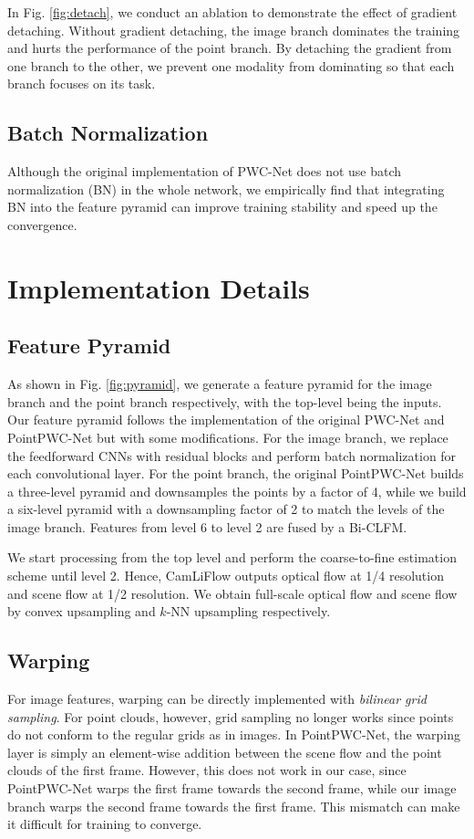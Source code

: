 \documentclass[10pt,twocolumn,letterpaper]{article}
\begin{document}
In Fig. \ref{fig:detach}, we conduct an ablation to demonstrate the effect of gradient detaching. Without gradient detaching, the image branch dominates the training and hurts the performance of the point branch. By detaching the gradient from one branch to the other, we prevent one modality from dominating so that each branch focuses on its task.

\subsection{Batch Normalization} Although the original implementation of PWC-Net \cite{sun2018pwc} does not use batch normalization (BN) \cite{ioffe2015batchnorm} in the whole network, we empirically find that integrating BN into the feature pyramid can improve training stability and speed up the convergence.

\section{Implementation Details}

\subsection{Feature Pyramid} As shown in Fig. \ref{fig:pyramid}, we generate a feature pyramid for the image branch and the point branch respectively, with the top-level being the inputs. Our feature pyramid follows the implementation of the original PWC-Net \cite{sun2018pwc} and PointPWC-Net \cite{wu2019pointpwc} but with some modifications. For the image branch, we replace the feedforward CNNs with residual blocks \cite{he2015resnet} and perform batch normalization for each convolutional layer. For the point branch, the original PointPWC-Net builds a three-level pyramid and downsamples the points by a factor of 4, while we build a six-level pyramid with a downsampling factor of 2 to match the levels of the image branch. Features from level 6 to level 2 are fused by a Bi-CLFM.

We start processing from the top level and perform the coarse-to-fine estimation scheme until level 2. Hence, CamLiFlow outputs optical flow at 1/4 resolution and scene flow at 1/2 resolution. We obtain full-scale optical flow and scene flow by convex upsampling \cite{teed2020raft} and $k$-NN upsampling respectively.

\subsection{Warping} For image features, warping can be directly implemented with \textit{bilinear grid sampling}. For point clouds, however, grid sampling no longer works since points do not conform to the regular grids as in images. In PointPWC-Net, the warping layer is simply an element-wise addition between the scene flow and the point clouds of the first frame. However, this does not work in our case, since PointPWC-Net warps the first frame towards the second frame, while our image branch warps the second frame towards the first frame. This mismatch can make it difficult for training to converge.
\end{document}
